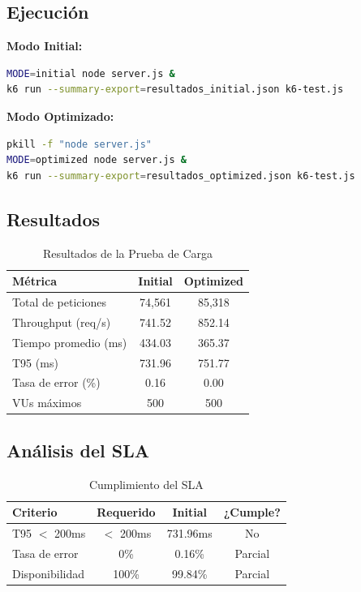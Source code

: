 \documentclass[12pt, a4paper]{article}
\begin{document}
\subsection{Ejecución}

\textbf{Modo Initial:}
\begin{lstlisting}[language=bash]
MODE=initial node server.js &
k6 run --summary-export=resultados_initial.json k6-test.js
\end{lstlisting}

\textbf{Modo Optimizado:}
\begin{lstlisting}[language=bash]
pkill -f "node server.js"
MODE=optimized node server.js &
k6 run --summary-export=resultados_optimized.json k6-test.js
\end{lstlisting}

\subsection{Resultados}

\begin{table}[H]
\centering
\caption{Resultados de la Prueba de Carga}
\label{tab:resultados}
\begin{tabular}{lcc}
\toprule
\textbf{Métrica} & \textbf{Initial} & \textbf{Optimized} \\
\midrule
Total de peticiones & 74,561 & 85,318 \\
Throughput (req/s) & 741.52 & 852.14 \\
Tiempo promedio (ms) & 434.03 & 365.37 \\
T95 (ms) & 731.96 & 751.77 \\
Tasa de error (\%) & 0.16 & 0.00 \\
VUs máximos & 500 & 500 \\
\bottomrule
\end{tabular}
\end{table}

\subsection{Análisis del SLA}

\begin{table}[H]
\centering
\caption{Cumplimiento del SLA}
\label{tab:sla}
\begin{tabular}{lccc}
\toprule
\textbf{Criterio} & \textbf{Requerido} & \textbf{Initial} & \textbf{¿Cumple?} \\
\midrule
T95 $<$ 200ms & $<$ 200ms & 731.96ms & No \\
Tasa de error & 0\% & 0.16\% & Parcial \\
Disponibilidad & 100\% & 99.84\% & Parcial \\
\bottomrule
\end{tabular}
\end{table}
\end{document}
